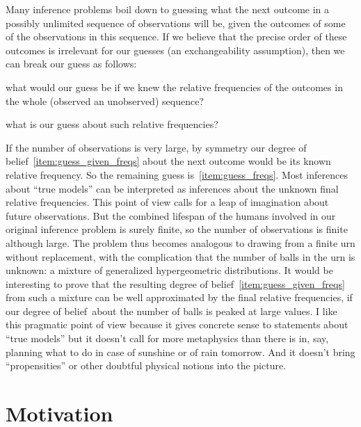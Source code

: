 \documentclass[\ifafour a4paper,12pt,\else a5paper,10pt,\fi%
onecolumn,oneside,article,%
british%
]{memoir}
\theoremstyle{remark}
\theoremstyle{innote}
\renewcommand*{\|}{\mathpunct{|}}
\newcommand*{\dob}{degree of belief}
\begin{document}
Many inference problems boil down to guessing what the next outcome in a
possibly unlimited sequence of observations will be, given the outcomes of
some of the observations in this sequence. If we believe that the precise
order of these outcomes is irrelevant for our guesses (an exchangeability
assumption), then we can break our guess as follows:
\begin{enumerate*}[(\alph*)]
\item\label{item:guess_given_freqs}what would our guess be if we knew the
  relative frequencies of the outcomes in the whole (observed an
  unobserved) sequence?
\item\label{item:guess_freqs}what is our guess about such relative frequencies?
\end{enumerate*}
If the number of observations is very large, by symmetry our
\dob~\ref{item:guess_given_freqs} about the next outcome would be its known
relative frequency. So the remaining guess is~\ref{item:guess_freqs}.
Most inferences about \enquote{true models} can be interpreted as
inferences about the unknown final relative frequencies. This point of view
calls for a leap of imagination about future observations. But the combined
lifespan of the humans involved in our original inference problem is surely
finite, so the number of observations is finite although large. The problem
thus becomes analogous to drawing from a finite urn without replacement,
with the complication that the number of balls in the urn is unknown: a
mixture of generalized hypergeometric distributions. It would be
interesting to prove that the resulting \dob~\ref{item:guess_given_freqs}
from such a mixture can be well approximated by the final relative
frequencies, if our \dob\ about the number of balls is peaked at large
values. I like this pragmatic point of view because it gives concrete sense
to statements about \enquote{true models} but it doesn't call for more
metaphysics than there is in, say, planning what to do in case of sunshine or of
rain tomorrow. And it doesn't bring \enquote{propensities} or other
doubtful physical notions into the picture.



\section{Motivation}
\label{sec:motivation}
\end{document}
